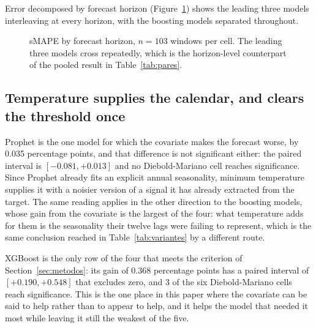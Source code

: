 Error decomposed by forecast horizon (Figure~\ref{fig:horizonte}) shows the leading three
models interleaving at every horizon, with the boosting models separated throughout.

\begin{figure}[htbp]
\centering

\caption{sMAPE by forecast horizon, $n=103$ windows per cell. The leading three models
cross repeatedly, which is the horizon-level counterpart of the pooled result in
Table~\ref{tab:pares}.}
\label{fig:horizonte}
\end{figure}

\subsection{Temperature supplies the calendar, and clears the threshold once}



Prophet is the one model for which the covariate makes the forecast worse, by 0.035
percentage points, and that difference is not significant either: the paired interval is
$[-0.081, +0.013]$ and no Diebold-Mariano cell reaches significance. Since Prophet already
fits an explicit annual seasonality, minimum temperature supplies it with a noisier version
of a signal it has already extracted from the target. The same reading applies in the other
direction to the boosting models, whose gain from the covariate is the largest of the four:
what temperature adds for them is the seasonality their twelve lags were failing to
represent, which is the same conclusion reached in Table~\ref{tab:variantes} by a different
route.

XGBoost is the only row of the four that meets the criterion of Section~\ref{sec:metodos}: its
gain of 0.368 percentage points has a paired interval of $[+0.190, +0.548]$ that excludes
zero, and 3 of the six Diebold-Mariano cells reach significance. This is the one place in
this paper where the covariate can be said to help rather than to appear to help, and it helps
the model that needed it most while leaving it still the weakest of the five.



